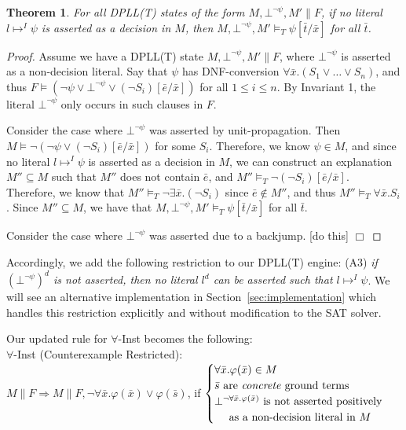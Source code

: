 \documentclass{llncs}
\newtheorem{thm}{Theorem}
\begin{document}
\begin{thm}
For all DPLL(T) states of the form $M, \bot^{\neg \psi}, M' \parallel F$, if no literal $l \mapsto^I \psi$ is asserted as a decision in $M$, then $M, \bot^{\neg \psi}, M' \models_T \psi[\bar{t}/\bar{x}]$ for all $\bar{t}$.
\end{thm}
\begin{proof}
Assume we have a DPLL(T) state $M, \bot^{\neg \psi}, M' \parallel F$, where $\bot^{\neg \psi}$ is asserted as a non-decision literal.
Say that $\psi$ has DNF-conversion $\forall \bar{x}. (S_1 \vee \ldots \vee S_n)$, and thus $F \models ( \neg \psi \vee \bot^{\neg \psi} \vee (\neg S_i)[\bar{e}/\bar{x}])$ for all $1 \leq i \leq n$.
By Invariant 1, the literal $\bot^{\neg \psi}$ only occurs in such clauses in $F$.

Consider the case where $\bot^{\neg \psi}$ was asserted by unit-propagation.
Then $M \models \neg ( \neg \psi \vee (\neg S_i)[\bar{e}/\bar{x}])$ for some $S_i$.
Therefore, we know $\psi \in M$, and since no literal $l \mapsto^I \psi$ is asserted as a decision in $M$, 
we can construct an explanation $M'' \subseteq M$ such that $M''$ does not contain $\bar{e}$, and $M'' \models_T \neg (\neg S_i)[\bar{e}/\bar{x}]$.
Therefore, we know that $M'' \models_T \neg \exists \bar{x}. (\neg S_i)$ since $\bar{e} \not\in M''$, and thus $M'' \models_T \forall \bar{x}. S_i$.
Since $M'' \subseteq M$, we have that $M, \bot^{\neg \psi}, M' \models_T \psi[\bar{t}/\bar{x}]$ for all $\bar{t}$.

Consider the case where $\bot^{\neg \psi}$ was asserted due to a backjump.
[do this] $\Box$
\end{proof}

Accordingly, we add the following restriction to our DPLL(T) engine: (A3) \emph{if $(\bot^{\neg \psi})^d$ is not asserted, then no literal $l^d$ can be asserted such that $l \mapsto^I \psi$}.
We will see an alternative implementation in Section~\ref{sec:implementation} which handles this restriction explicitly and without modification to the SAT solver.

Our updated rule for $\forall$-Inst becomes the following: \\

\noindent $\forall$-Inst (Counterexample Restricted): \\

$M \parallel F \Longrightarrow M \parallel F, \neg \forall \bar{x}. \varphi( \bar{ x } ) \vee \varphi( \bar{ s } )$, if   
$\begin{cases}
  \forall \bar{x}. \varphi( \bar{ x } ) \in M \\
  \bar{ s } \text{ are \emph{concrete} ground terms} \\
  \bot^{\neg \forall \bar{x}. \varphi( \bar{ x } )} \text{ is not asserted positively }\\
  \text{ \ \ \ as a non-decision literal in $M$ } \\    
\end{cases}$ \\
\end{document}
